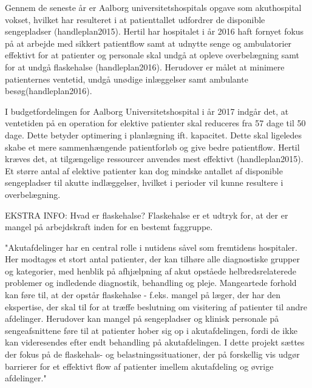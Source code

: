 Gennem de seneste år er Aalborg universitetshospitals opgave som akuthospital vokset, hvilket har resulteret i at patienttallet udfordrer de disponible sengepladser (handleplan2015). Hertil har hospitalet i år 2016 haft fornyet fokus på at arbejde med sikkert patientflow samt at udnytte senge og ambulatorier effektivt for at patienter og personale skal undgå at opleve overbelægning samt for at undgå flaskehalse (handleplan2016). Herudover er målet at minimere patienternes ventetid, undgå unødige inlæggelser samt ambulante besøg(handleplan2016). 

\noindent
I budgetfordelingen for Aalborg Universitetshospital i år 2017 indgår det, at ventetiden på en operation for elektive patienter skal reduceres fra 57 dage til 50 dage. \cite{Budget2016} Dette betyder optimering i planlægning ift. kapacitet. Dette skal ligeledes skabe et mere sammenhængende patientforløb og give bedre patientflow. Hertil kræves det, at tilgængelige ressourcer anvendes mest effektivt (handleplan2015). Et større antal af elektive patienter kan dog mindske antallet af disponible sengepladser til akutte indlæggelser, hvilket i perioder vil kunne resultere i overbelægning. 


EKSTRA INFO: Hvad er flaskehalse?
Flaskehalse er et udtryk for, at der er mangel på arbejdskraft inden for en bestemt faggruppe. 

"Akutafdelinger har en central rolle i nutidens såvel som fremtidens hospitaler. Her modtages et stort antal patienter, der kan tilhøre alle diagnostiske grupper og kategorier, med henblik på afhjælpning af akut opståede helbredsrelaterede problemer og indledende diagnostik, behandling og pleje. Mangeartede forhold kan føre til, at der opstår flaskehalse - f.eks. mangel på læger, der har den ekspertise, der skal til for at træffe beslutning om visitering af patienter til andre afdelinger. Herudover kan mangel på sengepladser og klinisk personale på sengeafsnittene føre til at patienter hober sig op i akutafdelingen, fordi de ikke kan videresendes efter endt behandling på akutafdelingen. I dette projekt sættes der fokus på de flaskehals- og belastningssituationer, der på forskellig vis udgør barrierer for et effektivt flow af patienter imellem akutafdeling og øvrige afdelinger." 




